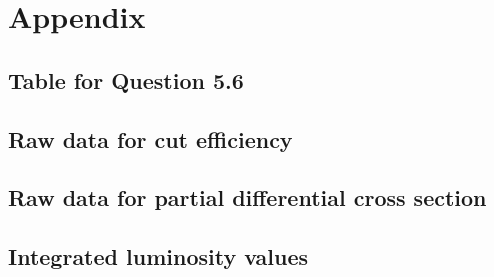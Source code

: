 \clearpage
\appendix
\section{Appendix}
\subsection{Table for Question 5.6}



	

\clearpage
\subsection{Raw data for cut efficiency}\label{app:59}


\clearpage
\subsection{Raw data for partial differential cross section}\label{app:510}


\subsection{Integrated luminosity values}

